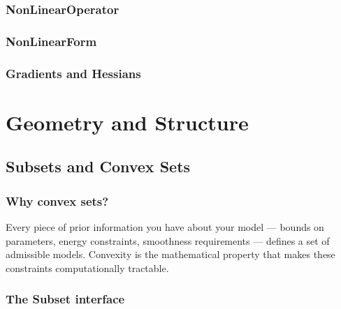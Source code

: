 \documentclass[11pt,twoside,openright]{book}
\theoremstyle{plain}
\theoremstyle{definition}
\theoremstyle{remark}
\begin{document}
\section{NonLinearOperator}
\label{sec:nonlinear-operator}

\section{NonLinearForm}
\label{sec:nonlinear-form}

\section{Gradients and Hessians}
\label{sec:frechet-derivatives}


\part{Geometry and Structure}
\label{part:geometry}

\chapter{Subsets and Convex Sets}
\label{ch:subsets}

\section{Why convex sets?}
\label{sec:why-convex}

\begin{whybox}
Every piece of prior information you have about your model ---
bounds on parameters, energy constraints, smoothness requirements ---
defines a set of admissible models. Convexity is the mathematical
property that makes these constraints computationally tractable.
\end{whybox}

\section{The Subset interface}
\label{sec:subset-interface}
\end{document}
